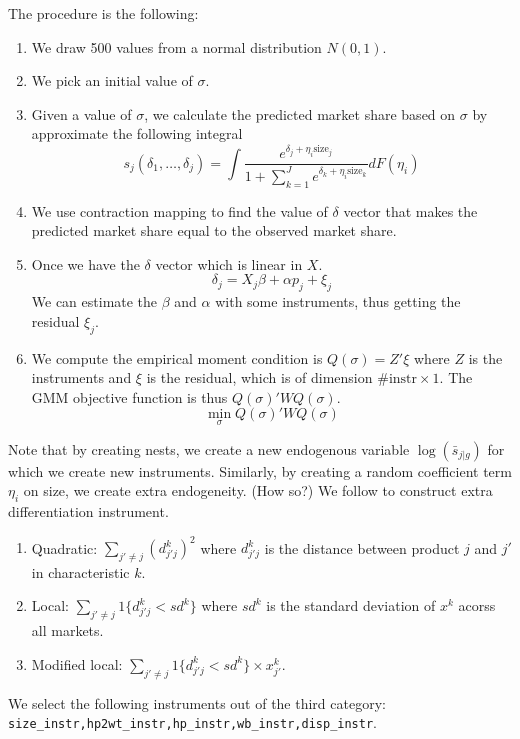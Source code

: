 \documentclass[12pt]{article}[margin=1in]
\begin{document}
The procedure is the following:
\begin{enumerate}
    \item We draw 500 values from a normal distribution $N(0,1)$.
    \item We pick an initial value of $\sigma$.
    \item Given a value of $\sigma$, we calculate the predicted market share based on
          $\sigma$ by approximate the following integral
          \begin{equation*}
              s_j(\delta_1,\ldots,\delta_j)=\int \frac{e^{\delta_j+\eta_i\text{size}_j}}{1+\sum_{k=1}^{J}e^{\delta_k+\eta_i\text{size}_k}}dF(\eta_i)
          \end{equation*}
    \item We use contraction mapping to find the value of $\delta$ vector that makes the
          predicted market share equal to the observed market share.
    \item Once we have the $\delta$ vector which is linear in $X$.
          \begin{equation*}
              \delta_j=X_j\beta+\alpha p_j+\xi_j
          \end{equation*}
          We can estimate the $\beta$ and $\alpha$ with some instruments, thus getting the residual $\xi_j$.
    \item We compute the empirical moment condition is $Q(\sigma)=Z'\xi$ where $Z$ is the
          instruments and $\xi$ is the residual, which is of dimension $ \# \text{instr}
              \times 1$. The GMM objective function is thus $Q(\sigma)'WQ(\sigma)$.
          \begin{equation*}
              \min_{\sigma} Q(\sigma)'WQ(\sigma)
          \end{equation*}
\end{enumerate}

Note that by creating nests, we create a new endogenous variable
$\log(\bar{s}_{j|g})$ for which we create new instruments. Similarly, by
creating a random coefficient term $\eta_i$ on size, we create extra
endogeneity. (How so?) We follow \citet{gandhihoude2019measuring} to construct
extra differentiation instrument.
\begin{enumerate}
    \item Quadratic: $\sum_{j' \neq j} (d_{j'j}^k)^2$ where $d_{j'j}^k$ is the distance
          between product $j$ and $j'$ in characteristic $k$.
    \item Local: $\sum_{j' \neq j} 1\{d_{j'j}^k < sd^k\}$ where $sd^k$ is the standard
          deviation of $x^k$ acorss all markets.
    \item Modified local: $\sum_{j' \neq j} 1\{d_{j'j}^k < sd^k\} \times x_{j'}^k$.
\end{enumerate}
We select the following instruments out of the third category: \verb|size_instr,hp2wt_instr,hp_instr,wb_instr,disp_instr|.
\end{document}
